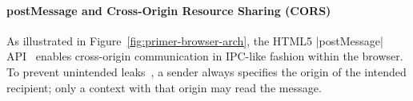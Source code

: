 

\paragraph{postMessage and Cross-Origin Resource Sharing (CORS)}

As illustrated in Figure~\ref{fig:primer-browser-arch}, the
HTML5 \js|postMessage| API~\cite{webmessaging} enables cross-origin
communication in IPC-like fashion within the browser. To prevent
unintended leaks~\cite{barth2009securing}, a sender always
specifies the origin of the intended recipient; only a context with
that origin may read the message.
%
%

